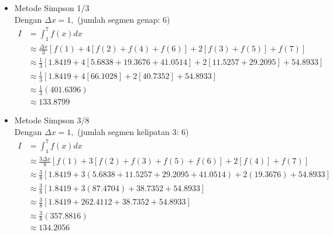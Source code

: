 \documentclass{article}
\begin{document}
\begin{enumerate}
\begin{itemize}
\begin{itemize}
            \item Metode Simpson 1/3 \\
            Dengan $\Delta x = 1,$ (jumlah segmen genap: 6)
            \begin{align*}
                I &= \int_{1}^{7} f(x) dx \\
                &\approx \frac{\Delta x}{3} [f(1) + 4[f(2) + f(4) + f(6)] + 2[f(3) + f(5)] + f(7)] \\
                &\approx \frac{1}{3} [\num{1,8419} + 4[\num{5,6838} + \num{19,3676} + \num{41,0514}] + 2[\num{11,5257} + \num{29,2095}] + \num{54,8933}] \\
                &\approx \frac{1}{3} [\num{1,8419} + 4[\num{66,1028}] + 2[\num{40,7352}] + \num{54,8933}] \\ 
                &\approx \frac{1}{3} (\num{401,6396}) \\
                &\approx \num{133,8799}
            \end{align*}

            \item Metode Simpson 3/8 \\
            Dengan $\Delta x = 1,$ (jumlah segmen kelipatan 3: 6)
            \begin{align*}
                I &= \int_{1}^{7} f(x) dx \\
                &\approx \frac{3\Delta x}{8} [f(1) + 3[f(2) + f(3) + f(5) + f(6)] + 2[f(4)] + f(7)] \\
                &\approx \frac{3}{8} [\num{1,8419} + 3(\num{5,6838} + \num{11,5257} + \num{29,2095} + \num{41,0514}) + 2(\num{19,3676}) + \num{54,8933}] \\
                &\approx \frac{3}{8} [\num{1,8419} + 3(\num{87,4704}) + \num{38,7352} + \num{54,8933}] \\
                &\approx \frac{3}{8} [\num{1,8419} + \num{262,4112} + \num{38,7352} + \num{54,8933}] \\
                &\approx \frac{3}{8} (\num{357,8816}) \\
                &\approx \num{134,2056}
            \end{align*}
        \end{itemize}

    \end{itemize}


\end{enumerate}
\end{document}
